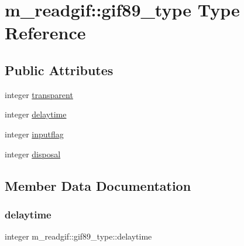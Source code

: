 \hypertarget{structm__readgif_1_1gif89__type}{}\section{m\+\_\+readgif\+:\+:gif89\+\_\+type Type Reference}
\label{structm__readgif_1_1gif89__type}
\subsection*{Public Attributes}
\begin{DoxyCompactItemize}
\item 
integer \mbox{\hyperlink{structm__readgif_1_1gif89__type_aa7d3577606d5b12cdaf941f2f467e1b3}{transparent}}
\item 
integer \mbox{\hyperlink{structm__readgif_1_1gif89__type_a01ebd8a9aaec996586e0843459fe1ceb}{delaytime}}
\item 
integer \mbox{\hyperlink{structm__readgif_1_1gif89__type_aa2e42514cf1c8e2e8b11740ab3a72115}{inputflag}}
\item 
integer \mbox{\hyperlink{structm__readgif_1_1gif89__type_a7074fba305068168af3a7e6044d26133}{disposal}}
\end{DoxyCompactItemize}


\subsection{Member Data Documentation}
\mbox{\label{structm__readgif_1_1gif89__type_a01ebd8a9aaec996586e0843459fe1ceb}} 
\subsubsection{\texorpdfstring{delaytime}{delaytime}}
{\footnotesize\ttfamily integer m\+\_\+readgif\+::gif89\+\_\+type\+::delaytime}

\mbox{\label{structm__readgif_1_1gif89__type_a7074fba305068168af3a7e6044d26133}} 
